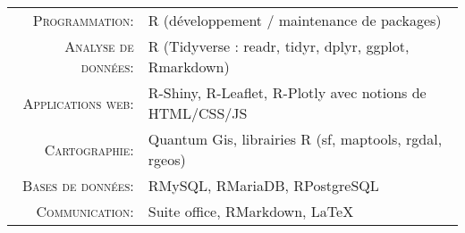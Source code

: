 %
%
%

\renewcommand{\arraystretch}{1.1}

	\begin{tabular}{>{}r>{}p{13cm}} 
		\textsc{Programmation:}              &    R (développement / maintenance de packages) \\
		\textsc{Analyse de données:}  	 &   R (Tidyverse : readr, tidyr, dplyr, ggplot, Rmarkdown)  \\
		\textsc{Applications web:}          &    R-Shiny, R-Leaflet, R-Plotly avec notions de HTML/CSS/JS \\ 
		\textsc{Cartographie:}               	&   Quantum Gis, librairies R (sf, maptools, rgdal, rgeos) \\ 
		\textsc{Bases de données:}       &   RMySQL, RMariaDB, RPostgreSQL \\ 
		\textsc{Communication:}			&   Suite office, RMarkdown, LaTeX
	\end{tabular}
